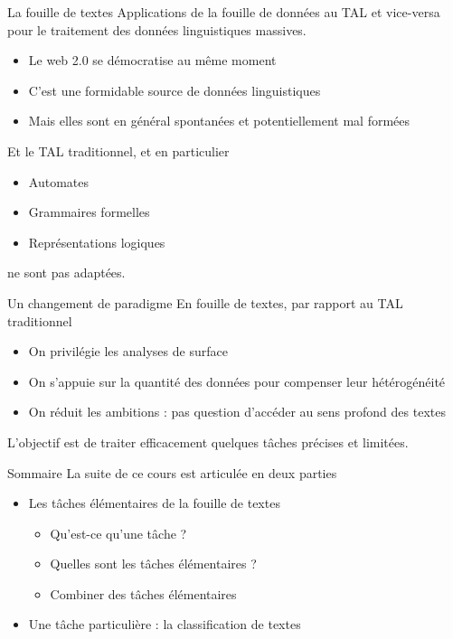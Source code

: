 \documentclass[hyperref={unicode}, xcolor={svgnames}]{beamer}
\begin{document}
\begin{frame}{La fouille de textes}
    Applications de la fouille de données au TAL et vice-versa pour le traitement des données linguistiques massives.

    \begin{itemize}
        \item Le web 2.0 se démocratise au même moment
        \item C'est une formidable source de données linguistiques
        \item Mais elles sont en général spontanées et potentiellement mal formées
    \end{itemize}

    Et le TAL traditionnel, et en particulier
    \begin{itemize}
        \item Automates
        \item Grammaires formelles
        \item Représentations logiques
    \end{itemize}
    ne sont pas adaptées.
\end{frame}

\begin{frame}{Un changement de paradigme}
    En fouille de textes, par rapport au TAL traditionnel
    \begin{itemize}
        \item On privilégie les analyses de surface
        \item On s'appuie sur la quantité des données pour compenser leur hétérogénéité
        \item On réduit les ambitions : pas question d'accéder au sens profond des textes
    \end{itemize}

    L'objectif est de traiter efficacement quelques \alert{tâches} précises et limitées.
\end{frame}

\begin{frame}{Sommaire}
    La suite de ce cours est articulée en deux parties
    \begin{itemize}
        \item Les tâches élémentaires de la fouille de textes
         \begin{itemize}
             \item Qu'est-ce qu'une tâche ?
             \item Quelles sont les tâches élémentaires ?
             \item Combiner des tâches élémentaires
         \end{itemize}
        \item Une tâche particulière : la classification de textes
    \end{itemize}
\end{frame}
\end{document}
